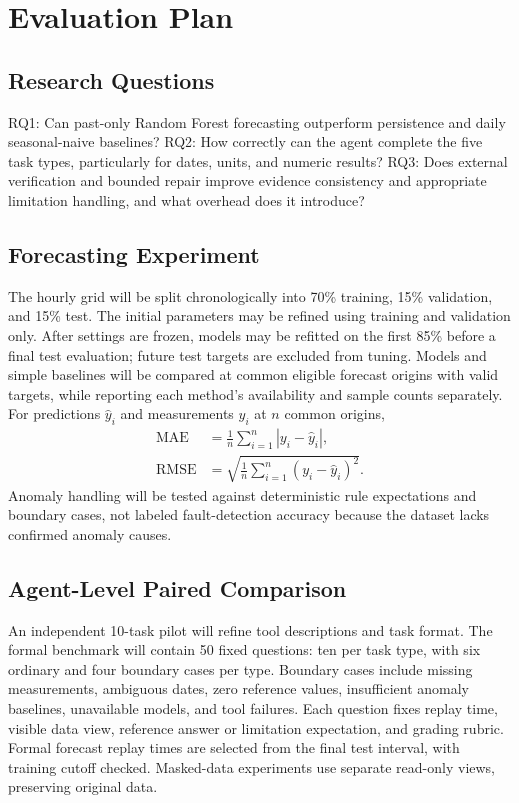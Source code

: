 \documentclass[conference]{IEEEtran}
\begin{document}
\section{Evaluation Plan}
\subsection{Research Questions}
RQ1: Can past-only Random Forest forecasting outperform persistence and daily seasonal-naive baselines? RQ2: How correctly can the agent complete the five task types, particularly for dates, units, and numeric results? RQ3: Does external verification and bounded repair improve evidence consistency and appropriate limitation handling, and what overhead does it introduce?

\subsection{Forecasting Experiment}
The hourly grid will be split chronologically into 70\% training, 15\% validation, and 15\% test. The initial parameters may be refined using training and validation only. After settings are frozen, models may be refitted on the first 85\% before a final test evaluation; future test targets are excluded from tuning. Models and simple baselines will be compared at common eligible forecast origins with valid targets, while reporting each method's availability and sample counts separately. For predictions $\hat y_i$ and measurements $y_i$ at $n$ common origins,
\begin{align}
\mathrm{MAE}&=\frac{1}{n}\sum_{i=1}^n|y_i-\hat y_i|,\\
\mathrm{RMSE}&=\sqrt{\frac{1}{n}\sum_{i=1}^n(y_i-\hat y_i)^2}.
\end{align}
Anomaly handling will be tested against deterministic rule expectations and boundary cases, not labeled fault-detection accuracy because the dataset lacks confirmed anomaly causes.

\subsection{Agent-Level Paired Comparison}
An independent 10-task pilot will refine tool descriptions and task format. The formal benchmark will contain 50 fixed questions: ten per task type, with six ordinary and four boundary cases per type. Boundary cases include missing measurements, ambiguous dates, zero reference values, insufficient anomaly baselines, unavailable models, and tool failures. Each question fixes replay time, visible data view, reference answer or limitation expectation, and grading rubric. Formal forecast replay times are selected from the final test interval, with training cutoff checked. Masked-data experiments use separate read-only views, preserving original data.
\end{document}
